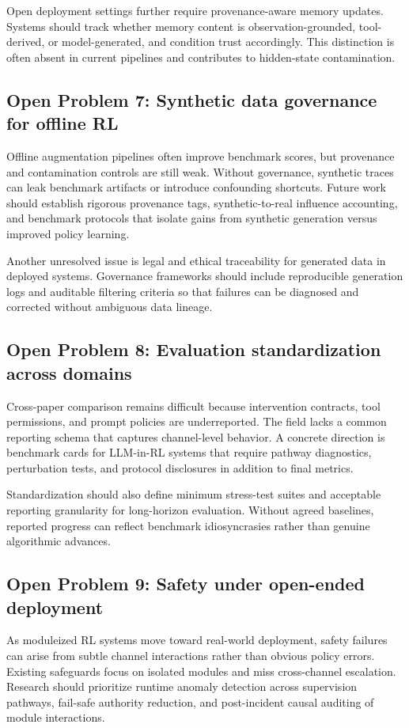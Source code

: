 \documentclass[pdflatex,sn-mathphys-num]{sn-jnl}
\begin{document}
Open deployment settings further require provenance-aware memory updates. Systems should track whether memory content is observation-grounded, tool-derived, or model-generated, and condition trust accordingly. This distinction is often absent in current pipelines and contributes to hidden-state contamination.

\subsection{Open Problem 7: Synthetic data governance for offline RL}
Offline augmentation pipelines often improve benchmark scores, but provenance and contamination controls are still weak. Without governance, synthetic traces can leak benchmark artifacts or introduce confounding shortcuts. Future work should establish rigorous provenance tags, synthetic-to-real influence accounting, and benchmark protocols that isolate gains from synthetic generation versus improved policy learning.

Another unresolved issue is legal and ethical traceability for generated data in deployed systems. Governance frameworks should include reproducible generation logs and auditable filtering criteria so that failures can be diagnosed and corrected without ambiguous data lineage.

\subsection{Open Problem 8: Evaluation standardization across domains}
Cross-paper comparison remains difficult because intervention contracts, tool permissions, and prompt policies are underreported. The field lacks a common reporting schema that captures channel-level behavior. A concrete direction is benchmark cards for LLM-in-RL systems that require pathway diagnostics, perturbation tests, and protocol disclosures in addition to final metrics.

Standardization should also define minimum stress-test suites and acceptable reporting granularity for long-horizon evaluation. Without agreed baselines, reported progress can reflect benchmark idiosyncrasies rather than genuine algorithmic advances.

\subsection{Open Problem 9: Safety under open-ended deployment}
As moduleized RL systems move toward real-world deployment, safety failures can arise from subtle channel interactions rather than obvious policy errors. Existing safeguards focus on isolated modules and miss cross-channel escalation. Research should prioritize runtime anomaly detection across supervision pathways, fail-safe authority reduction, and post-incident causal auditing of module interactions.
\end{document}
